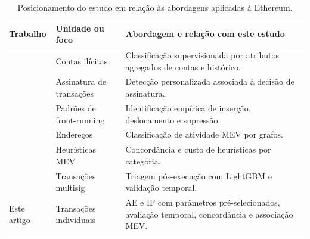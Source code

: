 \begin{table}[htbp]
\centering\small
\caption{Posicionamento do estudo em relação às abordagens aplicadas à Ethereum.}
\label{tab:comparacao-trabalhos}
\renewcommand{\arraystretch}{1.12}
\begin{tabularx}{\linewidth}{@{}>{\raggedright\arraybackslash}p{4cm}>{\raggedright\arraybackslash}p{2.6cm}>{\raggedright\arraybackslash}X@{}}
\toprule
Trabalho & Unidade ou foco & Abordagem e relação com este estudo \\
\midrule
\cite{Farrugia2020} & Contas ilícitas & Classificação supervisionada por atributos agregados de contas e histórico. \\
\cite{Podgorelec2020} & Assinatura de transações & Detecção personalizada associada à decisão de assinatura. \\
\cite{Torres2021} & Padrões de front-running & Identificação empírica de inserção, deslocamento e supressão. \\
\cite{Yao2025Mecon} & Endereços & Classificação de atividade MEV por grafos. \\
\cite{Naik2026Agreement} & Heurísticas MEV & Concordância e custo de heurísticas por categoria. \\
\cite{Chaudhary2026Multisig} & Transações multisig & Triagem pós-execução com LightGBM e validação temporal. \\
Este artigo & Transações individuais & AE e IF com parâmetros pré-selecionados, avaliação temporal, concordância e associação MEV. \\
\bottomrule
\end{tabularx}
\end{table}
